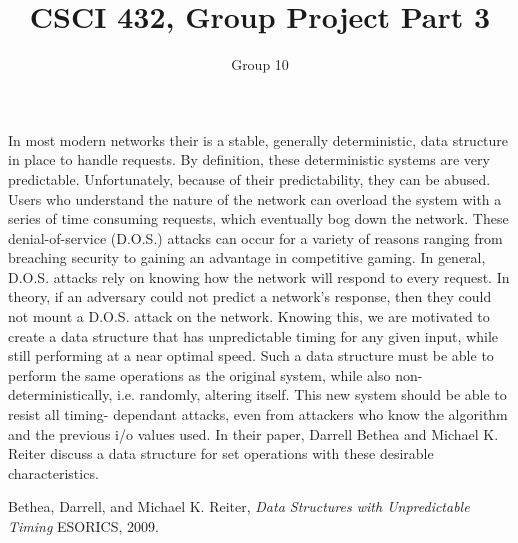 \documentclass[11pt]{article}
\title{CSCI 432, Group Project Part 3}
\author{Group 10}
\begin{document}
\maketitle



In most modern networks their is a stable, generally deterministic, data
structure in place to handle requests. By definition, these
deterministic systems are very predictable. Unfortunately, because of their
predictability, they can be abused. Users who understand the nature of 
the network can overload the system with a series of time consuming
requests, which eventually bog down the network. These denial-of-service
(D.O.S.) attacks can occur for a variety of reasons ranging from 
breaching security to gaining an advantage in competitive gaming. In 
general, D.O.S. attacks rely on knowing how the network will respond to 
every request. In theory, if an adversary could not predict a network's 
response, then they could not mount a D.O.S. attack on the network. 
Knowing this, we are motivated to 
create a data structure that has unpredictable timing 
for any given input, while still performing at a near optimal speed. 
Such a data structure must be able to perform the same operations as 
the original system, while also non-deterministically, i.e. randomly, 
altering itself. This new system should be able to resist all timing-
dependant attacks,
even from attackers who know the algorithm and the previous i/o values used.
In their paper, Darrell Bethea and Michael K. Reiter discuss a data
structure for set operations with these desirable characteristics\cite{Bethea09}.



\pagebreak

\begin{thebibliography}{9}
	
	Bethea, Darrell, and Michael K. Reiter,
	\emph{Data Structures with Unpredictable Timing}
	ESORICS,
	2009.
	
\end{thebibliography}
\end{document}

